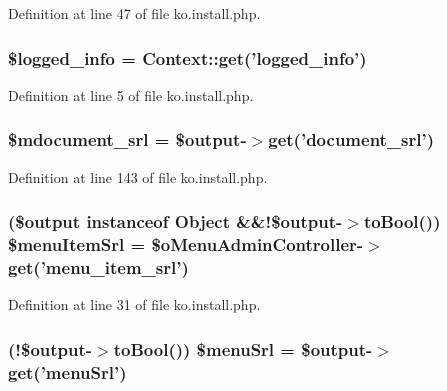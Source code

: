Definition at line 47 of file ko.\+install.\+php.

\hypertarget{ko_8install_8php_a193c1593ceb216e9fb05b0bad01ebbc8}{
\subsubsection[{\$logged\+\_\+info}]{\setlength{\rightskip}{0pt plus 5cm}\$logged\+\_\+info = {\bf Context\+::get}('logged\+\_\+info')}}\label{ko_8install_8php_a193c1593ceb216e9fb05b0bad01ebbc8}


Definition at line 5 of file ko.\+install.\+php.

\hypertarget{ko_8install_8php_a27c211d9a984964f84c8ffb6ea7328fc}{
\subsubsection[{\$mdocument\+\_\+srl}]{\setlength{\rightskip}{0pt plus 5cm}\$mdocument\+\_\+srl = \$output-\/$>$get('document\+\_\+srl')}}\label{ko_8install_8php_a27c211d9a984964f84c8ffb6ea7328fc}


Definition at line 143 of file ko.\+install.\+php.

\hypertarget{ko_8install_8php_a874928b6d7b44487718f1ede4a9f6ffe}{
\subsubsection[{\$menu\+Item\+Srl}]{ (\$output instanceof {\bf Object} \&\&!\$output-\/$>$to\+Bool()) \$menu\+Item\+Srl = \$o\+Menu\+Admin\+Controller-\/$>$get('menu\+\_\+item\+\_\+srl')}}\label{ko_8install_8php_a874928b6d7b44487718f1ede4a9f6ffe}


Definition at line 31 of file ko.\+install.\+php.

\hypertarget{ko_8install_8php_abb9a711d32f19d7aff02c8501ad6fb55}{
\subsubsection[{\$menu\+Srl}]{ (!\$output-\/$>$to\+Bool()) \$menu\+Srl = \$output-\/$>$get('menu\+Srl')}}\label{ko_8install_8php_abb9a711d32f19d7aff02c8501ad6fb55}


